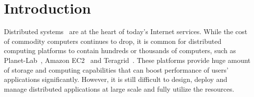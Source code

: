 \section{Introduction}


Distributed systems~\cite{Ghemawat2003, DeCandia2007} are at
the heart of today's Internet services. While the cost of
commodity computers continues to drop, it is common for
distributed computing platforms to contain hundreds or
thousands of computers, such as
Planet-Lab~\cite{Bavier2004}, Amazon
EC2~\cite{Garfinkel2007} and Teragrid~\cite{Catlett2002}.
These platforms provide huge amount of storage and computing
capabilities that can boost performance of users'
applications significantly. However, it is still difficult
to design, deploy and manage distributed applications at
large scale and fully utilize the resources.







